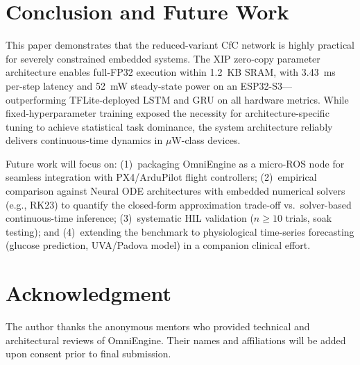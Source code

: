 \documentclass[conference]{IEEEtran}
\begin{document}
\section{Conclusion and Future Work}\label{sec:futurework}
This paper demonstrates that the reduced-variant CfC network is highly
practical for severely constrained embedded systems. The XIP zero-copy
parameter architecture enables full-FP32 execution within 1.2~KB SRAM,
with 3.43~ms per-step latency and 52~mW steady-state power on an ESP32-S3—
outperforming TFLite-deployed LSTM and GRU on all hardware metrics. While
fixed-hyperparameter training exposed the necessity for architecture-specific
tuning to achieve statistical task dominance, the system architecture reliably
delivers continuous-time dynamics in $\mu$W-class devices.

Future work will focus on: (1)~packaging OmniEngine as a micro-ROS node for
seamless integration with PX4/ArduPilot flight controllers; (2)~empirical
comparison against Neural ODE architectures with embedded numerical solvers
(e.g., RK23) to quantify the closed-form approximation trade-off vs.\
solver-based continuous-time inference; (3)~systematic HIL validation ($n
\geq 10$ trials, soak testing); and (4)~extending the benchmark to
physiological time-series forecasting (glucose prediction, UVA/Padova model)
in a companion clinical effort.

\section*{Acknowledgment}
The author thanks the anonymous mentors who provided technical and
architectural reviews of OmniEngine. Their names and affiliations will be
added upon consent prior to final submission.
\end{document}
